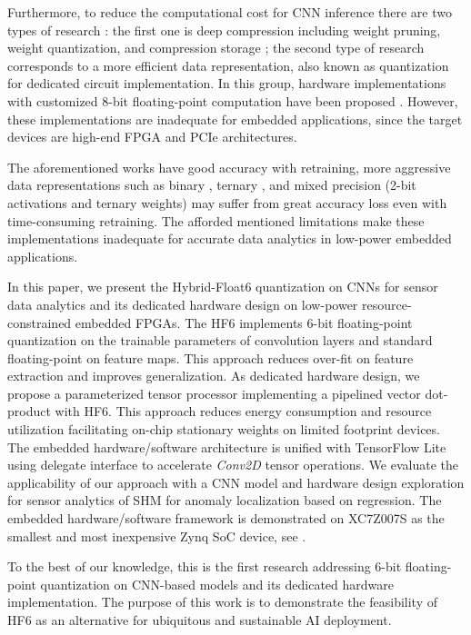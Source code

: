 Furthermore, to reduce the computational cost for CNN inference there are two types of research \cite{wu2021low}: the first one is deep compression including weight pruning, weight quantization, and compression storage \cite{han2015deep,han2015learning}; the second type of research corresponds to a more efficient data representation, also known as quantization for dedicated circuit implementation. In this group, hardware implementations with customized 8-bit floating-point computation have been proposed \cite{mei2017200mhz, wu2021low, lian2019high}. However, these implementations are inadequate for embedded applications, since the target devices are high-end FPGA and PCIe architectures.

The aforementioned works have good accuracy with retraining, more aggressive data representations such as binary \cite{courbariaux2015binaryconnect}, ternary \cite{lin2015neural}, and mixed precision (2-bit activations and ternary weights) \cite{colangelo2018exploration} may suffer from great accuracy loss even with time-consuming retraining. The afforded mentioned limitations make these implementations inadequate for accurate data analytics in low-power embedded applications.

In this paper, we present the Hybrid-Float6 quantization on CNNs for sensor data analytics and its dedicated hardware design on low-power resource-constrained embedded FPGAs. The HF6 implements 6-bit floating-point quantization on the trainable parameters of convolution layers and standard floating-point on feature maps. This approach reduces over-fit on feature extraction and improves generalization. As dedicated hardware design, we propose a parameterized tensor processor implementing a pipelined vector dot-product with HF6. This approach reduces energy consumption and resource utilization facilitating on-chip stationary weights on limited footprint devices. The embedded hardware/software architecture is unified with TensorFlow Lite using delegate interface to accelerate \emph{Conv2D} tensor operations. We evaluate the applicability of our approach with a CNN model and hardware design exploration for sensor analytics of SHM for anomaly localization based on regression. The embedded hardware/software framework is demonstrated on XC7Z007S as the smallest and most inexpensive Zynq SoC device, see .

To the best of our knowledge, this is the first research addressing 6-bit floating-point quantization on CNN-based models and its dedicated hardware implementation. The purpose of this work is to demonstrate the feasibility of HF6 as an alternative for ubiquitous and sustainable AI deployment.


